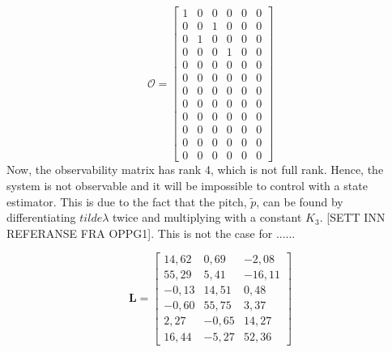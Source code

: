\begin{equation}\nonumber
    \mathcal {O}=
    {\begin{bmatrix}
        1 & 0 & 0 & 0 & 0 & 0\\
        0 & 0 & 1 & 0 & 0 & 0\\
        0 & 1 & 0 & 0 & 0 & 0\\
        0 & 0 & 0 & 1 & 0 & 0\\
        0 & 0 & 0 & 0 & 0 & 0\\
        0 & 0 & 0 & 0 & 0 & 0\\
        0 & 0 & 0 & 0 & 0 & 0\\
        0 & 0 & 0 & 0 & 0 & 0\\
        0 & 0 & 0 & 0 & 0 & 0\\
        0 & 0 & 0 & 0 & 0 & 0\\
        0 & 0 & 0 & 0 & 0 & 0\\
        0 & 0 & 0 & 0 & 0 & 0
    \end{bmatrix}}
\end{equation}
Now, the observability matrix has rank 4, which is not full rank. Hence, the system is not observable and it will be impossible to control with a state estimator. This is due to the fact that the pitch, $\tilde{p}$, can be found by differentiating $tilde{\lambda}$ twice and multiplying with a constant $K_3$. [SETT INN REFERANSE FRA OPPG1]. This is not the case for ...... 

\begin{equation}\nonumber
\mathbf{L} = \begin{bmatrix}
14,62 &	0,69 & -2,08\\
55,29 & 5,41 & -16,11\\
-0,13 & 14,51 & 0,48\\
-0,60 & 55,75 & 3,37\\
2,27 & -0,65 & 14,27\\
16,44 & -5,27 & 52,36
\end{bmatrix}
\end{equation}